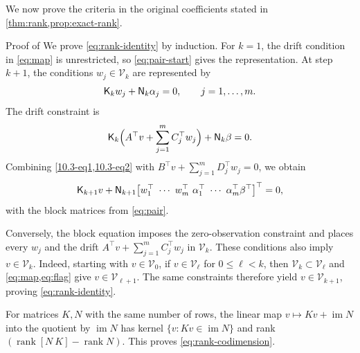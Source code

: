 \documentclass[twocolumn]{autart}
\begin{document}
We now prove the criteria in the original coefficients stated in
\cref{thm:rank,prop:exact-rank}.

\vspace{-2mm}

\begin{pf*}{Proof of }
We prove \cref{eq:rank-identity} by induction. For $k=1$, the drift
condition in \cref{eq:map} is unrestricted, so \cref{eq:pair-start} gives
the representation. At step $k+1$, the conditions
$w_j\in\mathcal V_k$ are represented by\vspace{-2mm}
%
\begin{equation}\label{10.3-eq1}
\mathsf K_kw_j+\mathsf N_k\alpha_j=0,\qquad j=1,\dots,m.\vspace{-2mm}
\end{equation}
%
The drift constraint is\vspace{-2mm}
%
\begin{equation}\label{10.3-eq2}
\mathsf K_k\Bigl(A^{\top}v+\sum_{j=1}^mC_j^{\top}w_j\Bigr)
+\mathsf N_k\beta=0.\vspace{-3mm}
\end{equation}
Combining \cref{10.3-eq1,10.3-eq2} with
$B^{\top}v+\sum\limits_{j=1}^mD_j^{\top}w_j=0$, we obtain\vspace{-2mm}
\begin{equation*}
\mathsf K_{k+1}v+\mathsf N_{k+1}
\bigl[w_1^\top\ \cdots\ w_m^\top\ \alpha_1^\top\ \cdots\ \alpha_m^\top  \beta^\top\bigr]^\top=0,\vspace{-2mm}
\end{equation*}
with the block matrices from \cref{eq:pair}.

Conversely, the block equation imposes the zero-observation constraint and
places every $w_j$ and the drift
$A^{\top}v+\sum\limits_{j=1}^mC_j^{\top}w_j$ in $\mathcal V_k$.
These conditions also imply $v\in\mathcal V_k$. Indeed, starting with
$v\in\mathcal V_0$, if $v\in\mathcal V_\ell$ for $0\leq\ell<k$,
then $\mathcal V_k\subset\mathcal V_\ell$ and \cref{eq:map,eq:flag}
give $v\in\mathcal V_{\ell+1}$. The same constraints therefore yield
$v\in\mathcal V_{k+1}$, proving \cref{eq:rank-identity}.

For matrices $K,N$ with the same number of rows, the linear map
$v\mapsto Kv+\operatorname{im}N$ into the quotient by
$\operatorname{im}N$ has kernel
$\{v:Kv\in\operatorname{im}N\}$ and rank
$(\operatorname{rank}[N\ K]-\operatorname{rank}N)$. This proves
\cref{eq:rank-codimension}.
\end{pf*}
\end{document}
